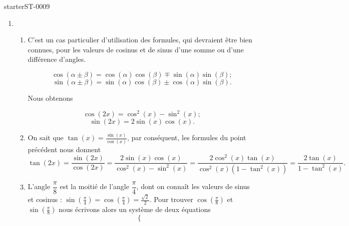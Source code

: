 
\begin{corrige}{starterST-0009}

\begin{enumerate}
\item \begin{enumerate}
\item C'est un cas particulier d'utilisation des formules, qui devraient \^etre bien connues, pour les valeurs de cosinus et de sinus d'une somme ou d'une différence d'angles. 
\begin{Aretenir}
  \begin{equation}
    \cos(\alpha \pm \beta) = \cos(\alpha)\cos(\beta)\mp\sin(\alpha)\sin(\beta) ; 
  \end{equation}
\begin{equation}
    \sin(\alpha \pm \beta) = \sin(\alpha)\cos(\beta)\pm\cos(\alpha)\sin(\beta).  
  \end{equation}
\end{Aretenir}
Nous obtenons 
\begin{Aretenir}
  \begin{equation}
    \cos(2x) = \cos^2(x)-\sin^2(x) ; 
  \end{equation}
\begin{equation}
    \sin(2x) = 2\sin(x)\cos(x).  
  \end{equation}
\end{Aretenir}
\item On sait que $\displaystyle \tan(x) = \frac{\sin(x)}{\cos(x)}$, par conséquent, les formules du point précédent nous donnent 
\begin{equation*}
  \tan(2x) = \frac{\sin(2x)}{\cos(2x)} =\frac{2\sin(x)\cos(x)}{\cos^2(x)-\sin^2(x)} = \frac{2\cos^2(x)\tan(x)}{\cos^2(x)\left(1-\tan^2(x)\right)} = \frac{2\tan(x)}{1-\tan^2(x)}.
\end{equation*}
\item L'angle $\dfrac{\pi}{8}$ est la moitié de l'angle $\dfrac{\pi}{4}$, dont on connaît les valeurs de sinus et cosinus :  $\displaystyle \sin\left(\frac{\pi}{4}\right) = \cos\left(\frac{\pi}{4}\right) = \frac{\sqrt{2}}{2}$. Pour trouver  $\displaystyle \cos \left(\frac{\pi}{8}\right)$ et $\displaystyle  \sin \left(\frac{\pi}{8}\right)$ nous écrivons alors un système de deux équations 
\begin{equation*}
  \begin{cases}

\end{cases}
\end{equation*}
\end{enumerate}
\end{enumerate}
\end{corrige}
